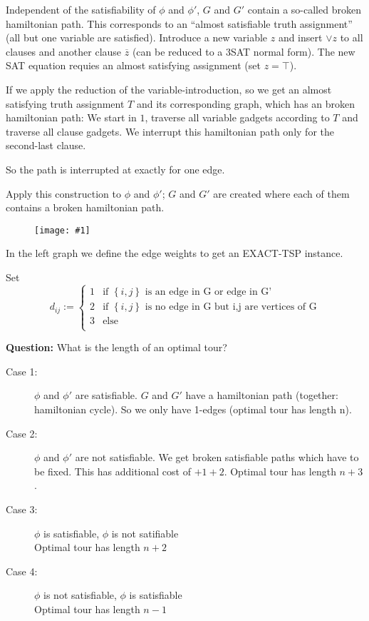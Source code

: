 \documentclass[a4paper]{article}
\newcommand{\drawing}[1]{%
 \begin{figure}[ht]
  \begin{center}
   \texttt{[image: \#1]}
  \end{center}
 \end{figure}
}
\newcommand{\set}[1]{\left\{#1\right\}}
\begin{document}
Independent of the satisfiability of $\phi$ and $\phi'$, $G$ and $G'$ contain
a so-called broken hamiltonian path. This corresponds to an ``almost satisfiable
truth assignment'' (all but one variable are satisfied).
%
Introduce a new variable $z$ and insert $\lor z$ to all clauses
and another clause $\overline{z}$ (can be reduced to a 3SAT
normal form). The new SAT equation requies an almost satisfying
assignment (set $z = \top$).

If we apply the reduction of the variable-introduction,
so we get an almost satisfying truth assignment $T$
and its corresponding graph, which has an broken hamiltonian
path:
We start in $1$, traverse all variable gadgets according to $T$
and traverse all clause gadgets. We interrupt this hamiltonian
path only for the second-last clause.

So the path is interrupted at exactly for one edge.

Apply this construction to $\phi$ and $\phi'$; $G$ and $G'$ are
created where each of them contains a broken hamiltonian path.

\drawing{vertex_combination.pdf}

In the left graph we define the edge weights to get an EXACT-TSP instance.

Set
\[
    d_{ij} := \begin{cases}
        1 & \text{if $\set{i,j}$ is an edge in G or edge in G'} \\
        2 & \text{if $\set{i,j}$ is no edge in G but i,j are vertices of G} \\
        3 & \text{else} \\
    \end{cases}
\]

\textbf{Question:} What is the length of an optimal tour?

\begin{description}
\item[Case 1:]
  $\phi$ and $\phi'$ are satisfiable.
  $G$ and $G'$ have a hamiltonian path (together: hamiltonian cycle).
  So we only have 1-edges (optimal tour has length n).

\item[Case 2:]
  $\phi$ and $\phi'$ are not satisfiable.
  We get broken satisfiable paths which have to be fixed. This has additional cost of $+1+2$.
  Optimal tour has length $n+3$.

\item[Case 3:]
  $\phi$ is satisfiable, $\phi$ is not satifiable \\
  Optimal tour has length $n+2$

\item[Case 4:]
  $\phi$ is not satisfiable, $\phi$ is satisfiable \\
  Optimal tour has length $n-1$
\end{description}
\end{document}
